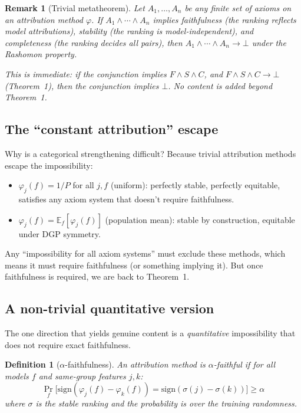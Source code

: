 \documentclass{article}
\newtheorem{definition}[theorem]{Definition}
\newtheorem{remark}[theorem]{Remark}
\begin{document}
\begin{remark}[Trivial metatheorem]
Let $A_1, \ldots, A_n$ be any finite set of axioms on an
attribution method $\varphi$. If $A_1 \wedge \cdots \wedge A_n$
implies faithfulness (the ranking reflects model attributions),
stability (the ranking is model-independent), and completeness
(the ranking decides all pairs), then
$A_1 \wedge \cdots \wedge A_n \to \bot$ under the Rashomon property.

This is immediate: if the conjunction implies $F \wedge S \wedge C$,
and $F \wedge S \wedge C \to \bot$ (Theorem~1), then the conjunction
implies $\bot$. No content is added beyond Theorem~1.
\end{remark}

\subsection{The ``constant attribution'' escape}

Why is a categorical strengthening difficult? Because trivial
attribution methods escape the impossibility:

\begin{itemize}
    \item $\varphi_j(f) = 1/P$ for all $j, f$ (uniform):
      perfectly stable, perfectly equitable, satisfies any
      axiom system that doesn't require faithfulness.
    \item $\varphi_j(f) = \mathbb{E}_f[\varphi_j(f)]$ (population mean):
      stable by construction, equitable under DGP symmetry.
\end{itemize}

Any ``impossibility for all axiom systems'' must exclude these
methods, which means it must require faithfulness (or something
implying it). But once faithfulness is required, we are back to
Theorem~1.

\subsection{A non-trivial quantitative version}

The one direction that yields genuine content is a
\emph{quantitative} impossibility that does not require exact
faithfulness.

\begin{definition}[$\alpha$-faithfulness]
An attribution method is \emph{$\alpha$-faithful} if for all
models $f$ and same-group features $j, k$:
\[
    \Pr_{f}\!\big[\text{sign}(\varphi_j(f) - \varphi_k(f)) =
    \text{sign}(\sigma(j) - \sigma(k))\big] \geq \alpha
\]
where $\sigma$ is the stable ranking and the probability is over
the training randomness.
\end{definition}
\end{document}
